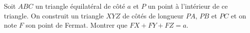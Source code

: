 Soit $ABC$ un triangle équilatéral de côté $a$ et $P$ un point à l'intérieur de ce triangle. On construit un triangle $XYZ$ de côtés de longueur $PA$, $PB$ et $PC$ et on note $F$ son point de Fermat. Montrer que $FX+FY+FZ=a$.